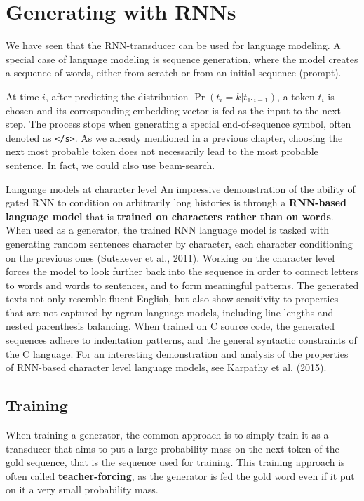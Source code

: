 \section{Generating with RNNs}
We have seen that the RNN-transducer can be used for language modeling. A special case of language modeling is sequence generation, where the model creates a sequence of words, either from scratch or from an initial sequence (prompt).

At time $i$, after predicting the distribution $\Pr(t_{i}=k|t_{1:i-1})$, a token $t_{i}$ is chosen and its corresponding embedding vector is fed as the input to the next step. The process stops when generating a special end-of-sequence symbol, often denoted as \texttt{</s>}. As we already mentioned in a previous chapter, choosing the next most probable token does not necessarily lead to the most probable sentence. In fact, we could also use beam-search.

\begin{observation}{Language models at character level}
An impressive demonstration of the ability of gated RNN to condition on arbitrarily long histories is through a \textbf{RNN-based language model} that is \textbf{trained on characters rather than on words}. When used as a generator, the trained RNN language model is tasked with generating random sentences character by character, each character conditioning on the previous ones (Sutskever et al., 2011). Working on the character level forces the model to look further back into the sequence in order to connect letters to words and words to sentences, and to form meaningful patterns. The generated texts not only resemble fluent English, but also show sensitivity to properties that are not captured by ngram language models, including line lengths and nested parenthesis balancing. When trained on C source code, the generated sequences adhere to indentation patterns, and the general syntactic constraints of the C language. For an interesting demonstration and analysis of the properties of RNN-based character level language models, see Karpathy et al. (2015).
\end{observation}

\subsection{Training}
When training a generator, the common approach is to simply train it as a transducer that aims to put a large probability mass on the next token of the gold sequence, that is the sequence used for training. This training approach is often called \textbf{teacher-forcing}, as the generator is fed the gold word even if it put on it a very small probability mass.

